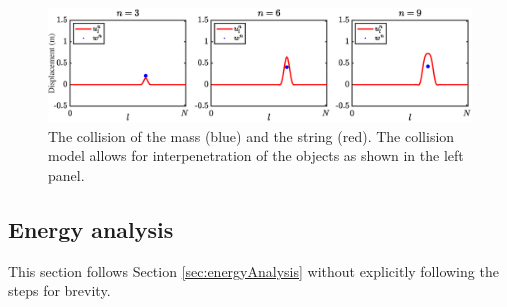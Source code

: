 \begin{figure}[h]
    \centering
    \includegraphics[width=\textwidth]{figures/interactions/stringMassCollision.eps}
    \caption{The collision of the mass (blue) and the string (red). The collision model allows for interpenetration of the objects as shown in the left panel. \label{fig:massStringCollision}}
\end{figure}

\subsection{Energy analysis}
This section follows Section \ref{sec:energyAnalysis} without explicitly following the steps for brevity. 

